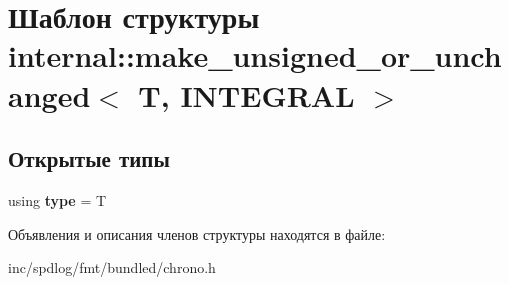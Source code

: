 \hypertarget{structinternal_1_1make__unsigned__or__unchanged}{}\section{Шаблон структуры internal\+:\+:make\+\_\+unsigned\+\_\+or\+\_\+unchanged$<$ T, I\+N\+T\+E\+G\+R\+AL $>$}
\label{structinternal_1_1make__unsigned__or__unchanged}
\subsection*{Открытые типы}
\begin{DoxyCompactItemize}
\item 
\mbox{\label{structinternal_1_1make__unsigned__or__unchanged_a04e57416bb09a90ed2212d033af8f19f}} 
using {\bfseries type} = T
\end{DoxyCompactItemize}


Объявления и описания членов структуры находятся в файле\+:\begin{DoxyCompactItemize}
\item 
inc/spdlog/fmt/bundled/chrono.\+h\end{DoxyCompactItemize}
